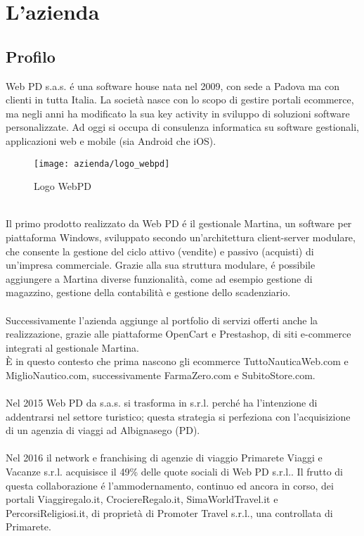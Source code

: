 
\chapter{L'azienda}
\label{cap:processi-metodologie}

\section{Profilo}
Web PD s.a.s. é una software house nata nel 2009, con sede a Padova ma con clienti in tutta Italia. La società nasce con lo scopo di gestire portali ecommerce, ma negli anni ha modificato la sua key activity in sviluppo di soluzioni software personalizzate. Ad oggi si occupa di consulenza informatica su software gestionali, applicazioni web e mobile (sia Android che iOS).\\
\begin{figure}[!h] 
	\centering 
	\texttt{[image: azienda/logo\_webpd]} 
	\caption{Logo WebPD}
\end{figure}
\\
Il primo prodotto realizzato da Web PD é il gestionale Martina, un software per piattaforma Windows, sviluppato secondo un’architettura client-server modulare, che consente la gestione del ciclo attivo (vendite) e passivo (acquisti) di un’impresa commerciale. Grazie alla sua struttura modulare, é possibile aggiungere a Martina diverse funzionalità, come ad esempio gestione di magazzino, gestione della contabilità e
gestione dello scadenziario.\\
\\
Successivamente l’azienda aggiunge al portfolio di servizi offerti anche la realizzazione, grazie alle piattaforme OpenCart e Prestashop, di siti e-commerce integrati al gestionale Martina. \\
È in questo contesto che prima nascono gli ecommerce TuttoNauticaWeb.com e MiglioNautico.com, successivamente FarmaZero.com e SubitoStore.com.\\
\\
Nel 2015 Web PD da s.a.s. si trasforma in s.r.l. perché ha l’intenzione di addentrarsi nel settore turistico; questa strategia si perfeziona con l’acquisizione di un agenzia di viaggi ad Albignasego (PD).\\
\\
Nel 2016 il network e franchising di agenzie di viaggio Primarete Viaggi e Vacanze s.r.l. acquisisce il 49\% delle quote sociali di Web PD s.r.l.. Il frutto di questa collaborazione é l’ammodernamento, continuo ed ancora in corso, dei portali Viaggiregalo.it, CrociereRegalo.it, SimaWorldTravel.it e PercorsiReligiosi.it, di proprietà di Promoter Travel s.r.l., una controllata di Primarete.\\

